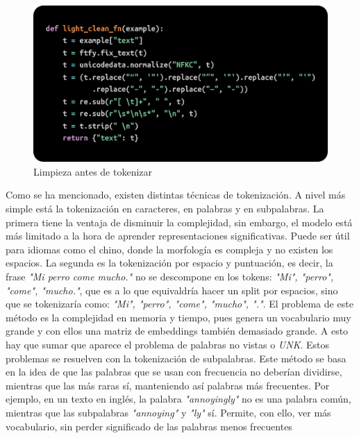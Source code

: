 \documentclass[11pt]{book}
\theoremstyle{plain}
\theoremstyle{definition}
\begin{document}
\begin{figure}[h]
    \centering
    \includegraphics[width=0.5\linewidth]{img/preclean.png}
    \caption{Limpieza antes de tokenizar}
    \label{fig:placeholder2}
\end{figure}
Como se ha mencionado, existen distintas técnicas de tokenización. A nivel más simple está la tokenización en caracteres, en palabras y en subpalabras. La primera tiene la ventaja de disminuir la complejidad, sin embargo, el modelo está más limitado a la hora de aprender representaciones significativas. Puede ser útil para idiomas como el chino, donde la morfología es compleja y no existen los espacios. La segunda es la tokenización por espacio y puntuación, es decir, la frase \textit{"Mi perro come mucho."} no se descompone en los tokens: \textit{"Mi", "perro", "come", "mucho."}, que es a lo que equivaldría hacer un split por espacios, sino que se tokenizaría como: \textit{"Mi", "perro", "come", "mucho", "."}. El problema de este método es la complejidad en memoria y tiempo, pues genera un vocabulario muy grande y con ellos una matriz de embeddings también demasiado grande. A esto hay que sumar que aparece el problema de palabras no vistas o \textit{UNK}. 
Estos problemas se resuelven con la tokenización de subpalabras. Este método se basa en la idea de que las palabras que se usan con frecuencia no deberían dividirse, mientras que las más raras sí, manteniendo así palabras más frecuentes. Por ejemplo, en un texto en inglés, la palabra \textit{"annoyingly"} no es una palabra común, mientras que las subpalabras \textit{"annoying"} y \textit{"ly"} sí. Permite, con ello, ver más vocabulario, sin perder significado de las palabras menos frecuentes \parencite{lmpo2020bpe}
\end{document}
